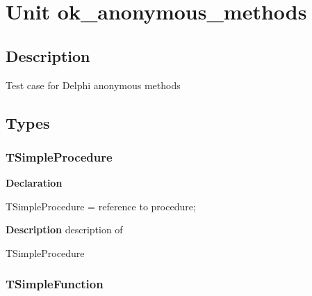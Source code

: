 \documentclass{report}
\newif\ifpdf
\begin{document}
\label{toc}\tableofcontents
\newpage
\newlength{\tmplength}
\chapter{Unit ok{\_}anonymous{\_}methods}
\label{ok_anonymous_methods}
\section{Description}
Test case for Delphi anonymous methods
\section{Types}
\ifpdf
\subsection*{\large{\textbf{TSimpleProcedure}}\normalsize\hspace{1ex}\hrulefill}
\else
\subsection*{TSimpleProcedure}
\fi
\label{ok_anonymous_methods-TSimpleProcedure}
\begin{list}{}{
\setlength{\itemindent}{0cm}
\setlength{\listparindent}{0cm}
\setlength{\leftmargin}{\evensidemargin}
\addtolength{\leftmargin}{\tmplength}
\settowidth{\labelsep}{X}
\addtolength{\leftmargin}{\labelsep}
\setlength{\labelwidth}{\tmplength}
}
\item[\textbf{Declaration}\hfill]
\ifpdf
\begin{flushleft}
\fi
\begin{ttfamily}
TSimpleProcedure = reference to procedure;\end{ttfamily}

\ifpdf
\end{flushleft}
\fi

\par
\item[\textbf{Description}]
description of \begin{ttfamily}TSimpleProcedure\end{ttfamily}

\end{list}
\ifpdf
\subsection*{\large{\textbf{TSimpleFunction}}\normalsize\hspace{1ex}\hrulefill}
\else
\end{document}
